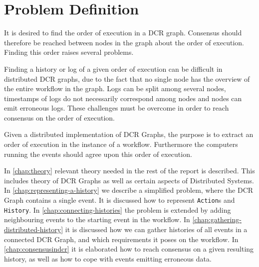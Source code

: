\chapter{Problem Definition} %
It is desired to find the order of execution in a DCR graph. Consensus should therefore be reached between nodes in the graph about the order of execution. Finding this order raises several problems.

Finding a history or log of a given order of execution can be difficult in distributed DCR graphs, due to the fact that no single node has the overview of the entire workflow in the graph.
Logs can be split among several nodes, timestamps of logs do not necessarily correspond among nodes and nodes can emit erroneous logs. These challenges must be overcome in order to reach consensus on the order of execution.

\newpar
Given a distributed implementation of DCR Graphs, the purpose is to extract an order of execution in the instance of a workflow. Furthermore the computers running the events should agree upon this order of execution.

\newpar
In \autoref{chap:theory} relevant theory needed in the rest of the report is described. This includes theory of DCR Graphs as well as certain aspects of Distributed Systems. In \autoref{chap:representing-a-history} we describe a simplified problem, where the DCR Graph contains a single event. It is discussed how to represent \texttt{Action}s and \texttt{History}. In \autoref{chap:connecting-histories} the problem is extended by adding neighbouring events to the starting event in the workflow. In \autoref{chap:gathering-distributed-history} it is discussed how we can gather histories of all events in a connected DCR Graph, and which requirements it poses on the workflow. In \autoref{chap:consensusindcr} it is elaborated how to reach consensus on a given resulting history, as well as how to cope with events emitting erroneous data.